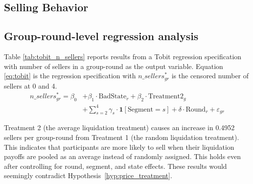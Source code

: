 \documentclass[thesis]{uathesis}
\begin{document}
\begin{body}
\begin{table}[H]
  \centering
  \caption{Pairwise correlations of trait measures}
  \label{tab:trait_correlations}
  
\end{table}

\begin{table}[H]
  \centering
  \caption{Pairwise correlations of emotion measures}
  \label{tab:emotion_correlations}
  
\end{table}

\begin{table}[H]
  \centering
  \caption{Group-round counts, seller counts, and selling timing by treatment and chat condition}
  \label{tab:summary_seller_counts}
  
\end{table}

\section{Selling Behavior}

\subsection{Group-round-level regression analysis}
Table \ref{tab:tobit_n_sellers} reports results from a Tobit regression specification with number of sellers in a group-round as the output variable. Equation \ref{eq:tobit} is the regression specification with $n\_sellers^*_{gr}$ is the censored number of sellers at 0 and 4.
  \begin{equation}
  \begin{split}
      n\_sellers^*_{gr} = \beta_0 &+ \beta_1 \cdot \text{BadState}_r + \beta_2 \cdot \text{Treatment2}_g \\
      &+ \sum_{s=2}^{4} \gamma_s \cdot \mathbf{1}[\text{Segment} = s] + \delta \cdot \text{Round}_r + \varepsilon_{gr}
  \end{split}
  \label{eq:tobit}
  \end{equation}


Treatment 2 (the average liquidation treatment) causes an increase in 0.4952 sellers per group-round from Treatment 1 (the random liquidation treatment). This indicates that participants are more likely to sell when their liquidation payoffs are pooled as an average instead of randomly assigned. This holds even after controlling for round, segment, and state effects. These results would seemingly contradict Hypothesis~\ref{hyp:price_treatment}.


\end{body}
\end{document}
